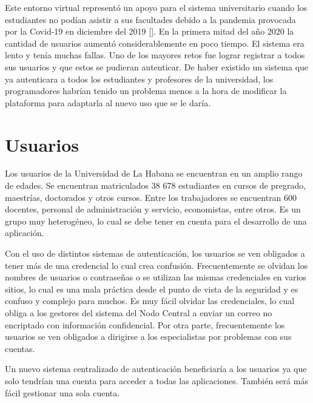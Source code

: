 Este entorno virtual representó un apoyo para el sistema universitario cuando los estudiantes no podían asistir a sus facultades debido a la pandemia provocada por la Covid-19 en diciembre del 2019 [\cite{ferrer2020pandemia}]. En la primera mitad del año 2020 la cantidad de usuarios aumentó considerablemente en poco tiempo. El sistema era lento y tenía muchas fallas. Uno de los mayores retos fue lograr registrar a todos sus usuarios y que estos se pudieran autenticar. De haber existido un sistema que ya autenticara a todos los estudiantes y profesores de la universidad, los programadores habrían tenido un problema menos a la hora de modificar la plataforma para adaptarla al nuevo uso que se le daría.

\section{Usuarios} \label{user-layer}

Los usuarios de la Universidad de La Habana se encuentran en un amplio rango de edades. Se encuentran matriculados 38 678 estudiantes en cursos de pregrado, maestrías, doctorados y otros cursos. Entre los trabajadores se encuentran 600 docentes, personal de administración y servicio, economistas, entre otros. Es un grupo muy heterogéneo, lo cual se debe tener en cuenta para el desarrollo de una aplicación.

Con el uso de distintos sistemas de autenticación, los usuarios se ven obligados a tener más de una credencial lo cual crea confusión. Frecuentemente se olvidan los nombres de usuarios o contraseñas o se utilizan las mismas credenciales en varios sitios, lo cual es una mala práctica desde el punto de vista de la seguridad y es confuso y complejo para muchos. Es muy fácil olvidar las credenciales, lo cual obliga a los gestores del sistema del Nodo Central a enviar un correo no encriptado con información confidencial. Por otra parte, frecuentemente los usuarios se ven obligados a dirigirse a los especialistas por problemas con sus cuentas. 

Un nuevo sistema centralizado de autenticación beneficiaría a los usuarios ya que solo tendrían una cuenta para acceder a todas las aplicaciones. También será más fácil gestionar una sola cuenta.